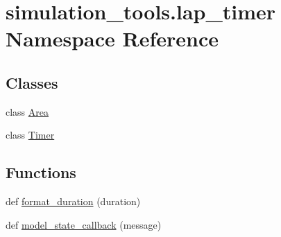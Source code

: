 \hypertarget{namespacesimulation__tools_1_1lap__timer}{}\section{simulation\+\_\+tools.\+lap\+\_\+timer Namespace Reference}
\label{namespacesimulation__tools_1_1lap__timer}
\subsection*{Classes}
\begin{DoxyCompactItemize}
\item 
class \hyperlink{classsimulation__tools_1_1lap__timer_1_1_area}{Area}
\item 
class \hyperlink{classsimulation__tools_1_1lap__timer_1_1_timer}{Timer}
\end{DoxyCompactItemize}
\subsection*{Functions}
\begin{DoxyCompactItemize}
\item 
def \hyperlink{namespacesimulation__tools_1_1lap__timer_a8ff1f7d7789d5ea92df79c94205a7273}{format\+\_\+duration} (duration)
\item 
def \hyperlink{namespacesimulation__tools_1_1lap__timer_adb38c2045a967ab6f7c0c6968599c2ff}{model\+\_\+state\+\_\+callback} (message)
\end{DoxyCompactItemize}
